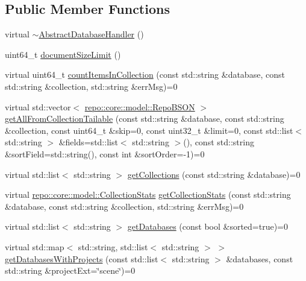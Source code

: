 \subsection*{Public Member Functions}
\begin{DoxyCompactItemize}
\item 
virtual \hyperlink{classrepo_1_1core_1_1handler_1_1_abstract_database_handler_a3aec08171736ff99191feaa32f64e7a0}{$\sim$\+Abstract\+Database\+Handler} ()
\item 
uint64\+\_\+t \hyperlink{classrepo_1_1core_1_1handler_1_1_abstract_database_handler_a14ef2fe2413faac9eecbeba2f83ec0d4}{document\+Size\+Limit} ()
\item 
virtual uint64\+\_\+t \hyperlink{classrepo_1_1core_1_1handler_1_1_abstract_database_handler_a862cb79b547fbd5a524a2f75ae114907}{count\+Items\+In\+Collection} (const std\+::string \&database, const std\+::string \&collection, std\+::string \&err\+Msg)=0
\item 
virtual std\+::vector$<$ \hyperlink{classrepo_1_1core_1_1model_1_1_repo_b_s_o_n}{repo\+::core\+::model\+::\+Repo\+B\+S\+O\+N} $>$ \hyperlink{classrepo_1_1core_1_1handler_1_1_abstract_database_handler_abbd7b86134fc60822b2ae6b9933624ca}{get\+All\+From\+Collection\+Tailable} (const std\+::string \&database, const std\+::string \&collection, const uint64\+\_\+t \&skip=0, const uint32\+\_\+t \&limit=0, const std\+::list$<$ std\+::string $>$ \&fields=std\+::list$<$ std\+::string $>$(), const std\+::string \&sort\+Field=std\+::string(), const int \&sort\+Order=-\/1)=0
\item 
virtual std\+::list$<$ std\+::string $>$ \hyperlink{classrepo_1_1core_1_1handler_1_1_abstract_database_handler_ac2007585bdd3c625fd02e61e305f3229}{get\+Collections} (const std\+::string \&database)=0
\item 
virtual \hyperlink{classrepo_1_1core_1_1model_1_1_collection_stats}{repo\+::core\+::model\+::\+Collection\+Stats} \hyperlink{classrepo_1_1core_1_1handler_1_1_abstract_database_handler_a4b1991d2ea832bebab6ffaac81d12350}{get\+Collection\+Stats} (const std\+::string \&database, const std\+::string \&collection, std\+::string \&err\+Msg)=0
\item 
virtual std\+::list$<$ std\+::string $>$ \hyperlink{classrepo_1_1core_1_1handler_1_1_abstract_database_handler_a68d7749c249111292974a00822a0e637}{get\+Databases} (const bool \&sorted=true)=0
\item 
virtual std\+::map$<$ std\+::string, std\+::list$<$ std\+::string $>$ $>$ \hyperlink{classrepo_1_1core_1_1handler_1_1_abstract_database_handler_ab7a050e1fac238a15d782efac324aaf4}{get\+Databases\+With\+Projects} (const std\+::list$<$ std\+::string $>$ \&databases, const std\+::string \&project\+Ext=\char`\"{}scene\char`\"{})=0

\end{DoxyCompactItemize}
